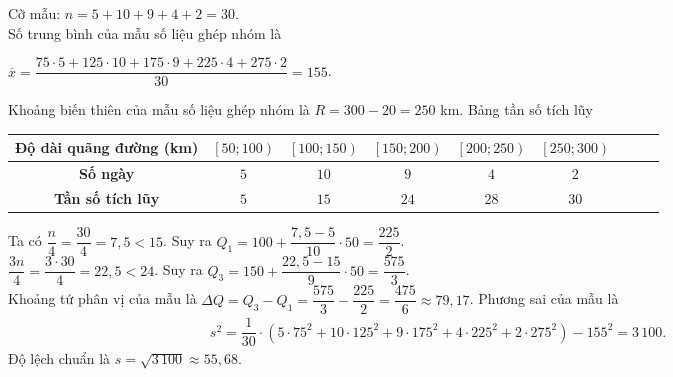 \begin{ex}
{\begin{itemchoice}
			Cỡ mẫu:	$n=5+10+9+4+2=30$.\\
			Số trung bình của mẫu số liệu ghép nhóm là
			\begin{center}
				$\overline{x}=\dfrac{75\cdot5+125\cdot10+175\cdot9+225\cdot4+275\cdot2}{30}=155$.
			\end{center} 
			\itemch
			Khoảng biến thiên của mẫu số liệu ghép nhóm là $R=300-20=250$ km.
			\itemch
			Bảng tần số tích lũy 
			\begin{center}
				{\renewcommand\arraystretch{1.5}\tabcolsep=2.5mm 
					\begin{tabular}{|c|c|c|c|c|c|c|c|c|}
						\hline 
						\textbf{Độ dài quãng đường (km)} &
						$\left[50;100 \right)$ &
						$\left[100;150 \right)$ &
						$\left[150;200 \right)$ &
						$\left[200;250 \right)$ &
						$\left[250;300 \right)$  \\
						\hline 
						\textbf{Số ngày} &
						$5$ &
						$10$ &
						$9$ &
						$4$ &
						$2$  \\
						\hline
						\textbf{Tần số tích lũy} &
						$5$ &
						$15$ &
						$24$ &
						$28$ &
						$30$  \\
						\hline
				\end{tabular}}
			\end{center}
			Ta có $\dfrac{n}{4}=\dfrac{30}{4}=7,5<15$. Suy ra	$Q_1=100+\dfrac{7{,}5-5}{10}\cdot 50=\dfrac{225}{2}$.\\
			$\dfrac{3n}{4}=\dfrac{3\cdot 30}{4}=22{,}5<24$. Suy ra
			$Q_3=150+\dfrac{22{,}5-15}{9}\cdot 50=\dfrac{575}{3}$. \\
			Khoảng tứ phân vị của mẫu là $\Delta Q=Q_3-Q_1=\dfrac{575}{3}-\dfrac{225}{2}=\dfrac{475}{6} \approx 79{,}17$.	
			\itemch 
			Phương sai của mẫu là 
			\begin{align*}
				s^2	= \dfrac{1}{30}\cdot\left(5\cdot75^2+10\cdot125^2+9\cdot175^2+4\cdot225^2+2\cdot275^2\right)-155^2= 3\,100.
			\end{align*}
			Độ lệch chuẩn là $s=\sqrt{3\,100}\approx 55{,}68$.
		\end{itemchoice}
	}
\end{ex}

